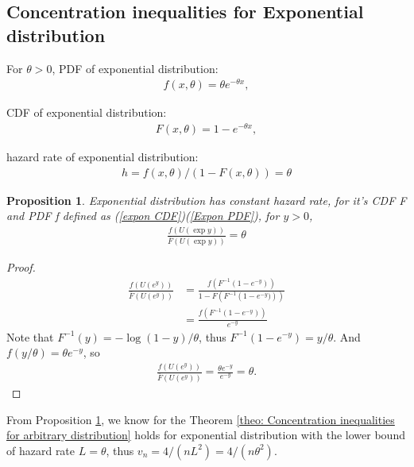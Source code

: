 \documentclass{article}
\theoremstyle{plain}
\newtheorem{prop}{Proposition}
\begin{document}
\subsection{Concentration inequalities for Exponential distribution}



For $\theta > 0$, PDF of exponential distribution:
\begin{align}
\label{Expon PDF}
    f(x, \theta) = \theta e^{-\theta x},
\end{align}

CDF of exponential distribution:
\begin{align}
\label{expon CDF}
    F(x, \theta) = 1 - e^{-\theta x},
\end{align}

hazard rate of exponential distribution:
\begin{align}
 h = f(x, \theta)/ (1-F(x, \theta)) = \theta
\end{align}


\begin{prop}
\label{prop: hazard rate bound for exp}
Exponential distribution has constant hazard rate, for it's CDF F and PDF f defined as (\ref{expon CDF})(\ref{Expon PDF}), for $y > 0$,
\begin{align}
    \frac{f(U(\exp{y}))}{\bar{F}(U(\exp{y}))} = \theta
\end{align}
\end{prop}

\begin{proof}
\begin{align}
    \frac{f(U(e^{y}))}{\bar{F}(U(e^{y}))} &=
    \frac{f(F^{-1}(1 - e^{-y}))}{1-F\left({F}^{-1}\left(1 - e^{-y})\right)\right)}\\
    &= \frac{f(F^{-1}(1 - e^{-y}))}{e^{-y}}
\end{align}
Note that $F^{-1}(y) = - \log (1 - y)/ \theta$, thus $F^{-1}(1 - e^{-y}) = y/ \theta$. And $f(y/\theta) = \theta e^{-y}$,
so
\begin{align}
    \frac{f(U(e^{y}))}{\bar{F}(U(e^{y}))} = \frac{\theta e^{-y}}{e^{-y}} = \theta.
\end{align}
\end{proof}

From Proposition \ref{prop: hazard rate bound for exp}, we know for the Theorem \ref{theo: Concentration inequalities for arbitrary distribution} holds for exponential distribution with the lower bound of hazard rate $L = \theta$, thus $v_n = 4/(nL^2) =  4/(n \theta^2)$.
\end{document}
